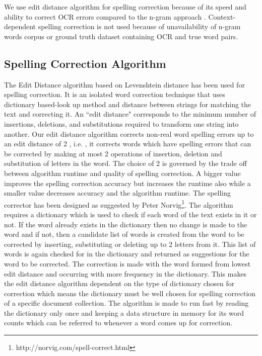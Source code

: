 \documentclass[12pt]{article}
\begin{document}
We use edit distance algorithm for spelling correction because of its speed and ability to correct OCR errors compared to the n-gram approach \cite{chattopadhyaya2013fast}. Context-dependent spelling correction is not used because of unavailability of n-gram words corpus or ground truth dataset containing OCR and true word pairs.


\subsection{Spelling Correction Algorithm}
\label{spell:algorithm}

The Edit Distance algorithm based on Levenshtein distance\cite{levenshtein1966binary} has been used for spelling correction. It is an isolated word correction technique that uses dictionary based-look up method and distance between strings for matching the text and correcting it. An ``edit distance" corresponds to the minimum number of insertions, deletions, and substitutions required to transform one string into another. Our edit distance algorithm corrects non-real word spelling errors up to an edit distance of 2 , i.e. , it corrects words which have spelling errors that can be corrected by making at most 2 operations of insertion, deletion and substitution of letters in the word. The choice of 2 is governed by the trade off between algorithm runtime and quality of spelling correction. A bigger value improves the spelling correction accuracy but increases the runtime also while a smaller value decreases accuracy and the algorithm runtime.
The spelling corrector has been designed as suggested by Peter Norvig\footnote{ http://norvig.com/spell-correct.html}. The algorithm requires a dictionary which is used to check if each word of the text exists in it or not. If the word already exists in the dictionary then no change is made to the word and if not, then a candidate list of words is created from the word to be corrected by inserting, substituting or deleting up to 2 letters from it.  This list of words is again checked for in the dictionary and returned as suggestions for the word to be corrected. The correction is made with the word formed from lowest edit distance and occurring with more frequency in the dictionary. This makes the edit distance algorithm dependent on the type of dictionary chosen for correction which means the dictionary must be well chosen for spelling correction of a specific document collection. The algorithm is made to run fast by reading the dictionary only once and keeping a data structure in memory for its word counts which can be referred to whenever a word comes up for correction.
\end{document}
